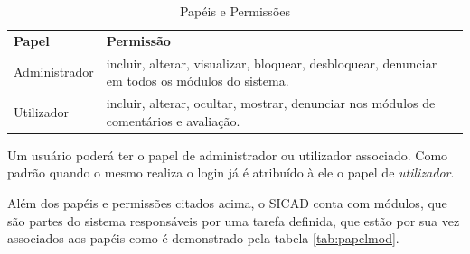 \documentclass[12pt, a4paper]{report}
\begin{document}
\begin{table}
 \centering
 {\renewcommand\arraystretch{1.25}
 \begin{tabular}{ l l }
  \cline{1-1}\cline{2-2}  
    \multicolumn{1}{|p{3.850cm}|}{\textbf{Papel} \centering } &
    \multicolumn{1}{p{4.217cm}|}{\textbf{Permissão} \centering }
  \\  
  \cline{1-1}\cline{2-2}  
    \multicolumn{1}{|p{3.850cm}|}{Administrador} &
    \multicolumn{1}{p{4.217cm}|}{incluir, alterar, visualizar, bloquear, desbloquear, denunciar em todos os módulos do sistema.}
  \\  
  \cline{1-1}\cline{2-2}  
    \multicolumn{1}{|p{3.850cm}|}{Utilizador} &
    \multicolumn{1}{p{4.217cm}|}{incluir, alterar, ocultar, mostrar, denunciar nos módulos de comentários e avaliação.}
  \\  
  \hline
 \end{tabular} }
 \caption{Papéis e Permissões}
  \label{tab:papelperm}
\end{table}

Um usuário poderá ter o papel de administrador ou utilizador associado. Como padrão quando o mesmo realiza o login já é atribuído à ele o papel de \textit{utilizador}.

Além dos papéis e permissões citados acima, o \ac{SICAD} conta com módulos, que são partes do sistema responsáveis por uma tarefa definida, que estão por sua vez associados aos papéis como é demonstrado pela tabela  \ref{tab:papelmod}.
\end{document}
